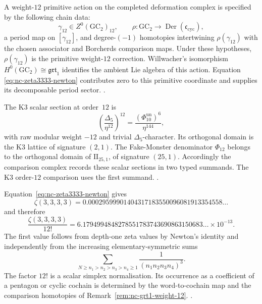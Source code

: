 \begin{remark}
\label{rem:nc-grt1-weight-12}
A weight-$12$ primitive action on the completed deformation complex is
specified by the following chain data:
\[
 \gamma_{12}\in Z^0(\mathrm{GC}_2)_{12},\qquad
 \rho\colon\mathrm{GC}_2\longrightarrow
 \operatorname{Der}(\mathfrak c_{\mathrm{cyc}}),
\]
a period map on \([\gamma_{12}]\), and degree-\((-1)\) homotopies
intertwining \(\rho(\gamma_{12})\) with the chosen associator and
Borcherds comparison maps.  Under these hypotheses,
\(\rho(\gamma_{12})\) is the primitive weight-$12$ correction.
Willwacher's isomorphism
\(H^0(\mathrm{GC}_2)\cong\mathfrak{grt}_1\) identifies the ambient
Lie algebra of this action.  Equation
\eqref{eq:nc-zeta3333-newton} contributes zero to this primitive
coordinate and supplies its decomposable period sector.
\cite{Willwacher2015,Brown2012,Drinfeld1990}.
\end{remark}

\begin{remark}
\label{rem:nc-fake-monster-non-interference}
The K3 scalar section at order~$12$ is
\[
 \left(\frac{\Delta_5}{\eta^{12}}\right)^{12}
 =
 \frac{(\Phi_{10}^{\mathrm{un}})^6}{\eta^{144}},
\]
with raw modular weight \(-12\) and trivial
\(\Delta_5\)-character.  Its orthogonal domain is the K3 lattice of
signature \((2,1)\).  The Fake-Monster denominator \(\Phi_{12}\)
belongs to the orthogonal domain of
\(\mathrm{II}_{25,1}\), of signature \((25,1)\).
Accordingly the comparison complex records these scalar sections in
two typed summands.  The K3 order-$12$ comparison uses the first
summand.
\cite{Borcherds1998,GritsenkoNikulin1998}.
\end{remark}

\begin{remark}
\label{rem:nc-c12-explicit}
Equation~\eqref{eq:nc-zeta3333-newton} gives
\[
 \zeta(3,3,3,3)
 =
 0.00029599901404317183550096081913354558\ldots
\]
and therefore
\[
 \frac{\zeta(3,3,3,3)}{12!}
 =
 6.1794994848278551783743690863150683\ldots\times10^{-13}.
\]
The first value follows from depth-one zeta values by Newton's
identity and independently from the increasing elementary-symmetric
sums
\[
 \sum_{N\geq n_1>n_2>n_3>n_4\geq1}
 \frac{1}{(n_1n_2n_3n_4)^3}.
\]
The factor \(12!\) is a scalar simplex normalisation.  Its occurrence
as a coefficient of a pentagon or cyclic cochain is determined by the
word-to-cochain map and the comparison homotopies of
Remark~\ref{rem:nc-grt1-weight-12}.
\cite{Hoffman1997,Brown2011}.
\end{remark}

